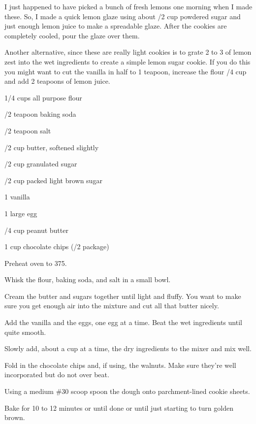 \begin{ChefNotes}
    {I just happened to have picked a bunch of fresh lemons one morning when I
        made these. So, I made a quick lemon glaze using about /2 cup powdered sugar and
        just enough lemon juice to make a spreadable glaze. After the cookies are completely cooled,
        pour the glaze over them.

        Another alternative, since these are really light cookies is to grate 2 to 3 \Tbl[s] of
        lemon zest into the wet ingredients to create a simple lemon sugar cookie. If you do this you
        might want to cut the vanilla in half to 1 teapoon, increase the flour /4 cup and
        add 2 teapoons of lemon juice.}
\end{ChefNotes}
%
%
%
%
\newpage



\begin{IngredientsAndSteps}
    \ListIngredientsAndSteps
    {
        1/4 cups all purpose flour

        /2 teapoon baking soda

        /2 teapoon salt

        \IngredientsSeparatorClear

        /2 cup butter, softened slightly

        /2 cup granulated sugar

        /2 cup packed light brown sugar

        \IngredientsSeparatorClear

        1 \tsp vanilla

        1 large egg

        /4 cup peanut butter

        1 cup chocolate chips (/2 package)
    }
    {
        Preheat oven to 375\Degrees[F].

        Whisk the flour, baking soda, and salt in a small bowl.

        Cream the butter and sugars together until light and fluffy. You want to make sure you get
        enough air into the mixture and cut all that butter nicely.

        Add the vanilla and the eggs, one egg at a time. Beat the wet ingredients until quite smooth.

        Slowly add, about a cup at a time, the dry ingredients to the mixer and mix well.

        Fold in the chocolate chips and, if using, the walnuts. Make sure they're well
        incorporated but do not over beat.

        Using a medium \#30 scoop spoon the dough onto parchment-lined cookie sheets.

        Bake for 10 to 12 minutes or until done or until just starting to turn golden brown.
    }
\end{IngredientsAndSteps}

